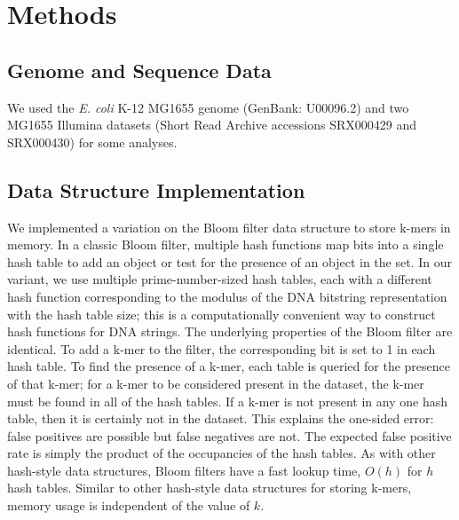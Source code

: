 \documentclass[12pt]{article} \usepackage{simplemargins}
\begin{document}

\section{Methods}

\subsection{Genome and Sequence Data}
We used the \emph{E. coli} K-12 MG1655 genome (GenBank: U00096.2) and two MG1655 Illumina 
datasets (Short Read Archive accessions SRX000429 and SRX000430) for some
analyses. 

\subsection{Data Structure Implementation}
We implemented a variation on the Bloom filter data structure to store
k-mers in memory. In a classic Bloom filter, multiple hash functions
map bits into a single hash table to add an object or test for the presence
of an object in the set. In our variant, we use multiple
prime-number-sized hash tables, each with a different hash
function corresponding to the modulus of the DNA bitstring
representation with the hash table size; this is a computationally convenient way to construct hash functions for DNA strings.  The underlying properties of
the Bloom filter are identical.  To add a k-mer to the
filter, the corresponding bit is set to 1 in each hash table.  To find
the presence of a k-mer, each table is queried for the presence of
that k-mer; for a k-mer to be considered present in the dataset, the
k-mer must be found in all of the hash tables.  If a k-mer is not
present in any one hash table, then it is certainly not in the
dataset. This explains the one-sided error: false positives are
possible but false negatives are not. The expected false positive rate
is simply the product of the occupancies of the hash tables.  As with
other hash-style data structures, Bloom filters have a fast lookup
time, $O(h)$ for $h$ hash tables.  Similar to other hash-style data
structures for storing k-mers, memory usage is independent of the
value of $k$.
\end{document}
